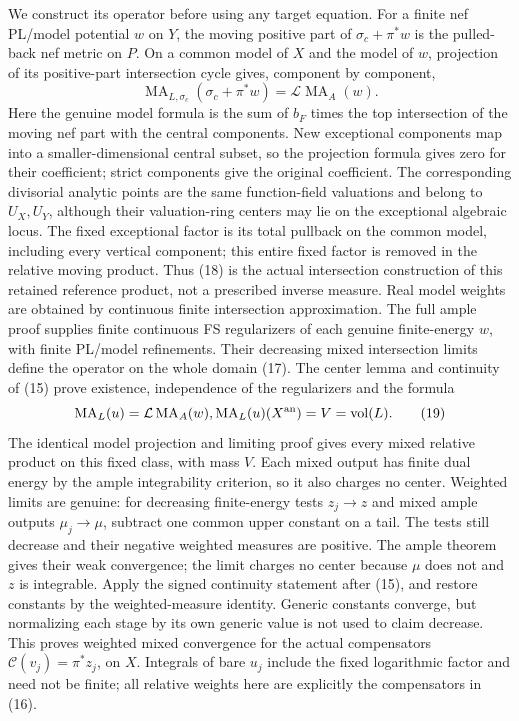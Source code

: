 \documentclass[11pt]{article}
\newcommand{\vol}{\operatorname{vol}}
\newcommand{\MA}{\operatorname{MA}}
\begin{document}
We construct its operator before using any target equation. For a
finite nef PL/model potential $w$ on $Y$, the moving positive part
of $\sigma_c+\pi^*w$ is the pulled-back nef metric on $P$.
On a common model of $X$ and the model of $w$, projection of its
positive-part intersection cycle gives, component by component,
\[
        \MA_{L,\sigma_c}(\sigma_c+\pi^*w)
                       =\mathcal L\MA_A(w).               \tag{18}
\]
Here the genuine model formula is the sum of $b_F$ times the top
intersection of the moving nef part with the central components.
New exceptional components map into a smaller-dimensional central
subset, so the projection formula gives zero for their coefficient;
strict components give the original coefficient. The corresponding
divisorial analytic points are the same function-field valuations
and belong to $U_X,U_Y$, although their valuation-ring centers may
lie on the exceptional algebraic locus. The fixed exceptional factor is its total pullback on the common
model, including every vertical component; this entire fixed factor is
removed in the relative moving product.
Thus (18) is the actual intersection construction of this retained
reference product, not a prescribed inverse measure. Real model
weights are obtained by continuous finite intersection approximation.
The full ample proof supplies finite continuous FS regularizers
of each genuine finite-energy $w$, with finite PL/model refinements.
Their decreasing mixed intersection limits define the operator on
the whole domain (17). The center lemma and continuity of (15)
prove existence, independence of the regularizers and the formula
\[
                 \MA_L(u)=\mathcal L\MA_A(w),
                   \MA_L(u)(X^{\rm an})=V=\vol(L).         \tag{19}
\]
The identical model projection and limiting proof gives every mixed
relative product on this fixed class, with mass $V$. Each mixed output
has finite dual energy by the ample integrability criterion, so it
also charges no center. Weighted limits are genuine: for decreasing
finite-energy tests $z_j\to z$ and mixed ample outputs
$\mu_j\to\mu$, subtract one common upper constant on a tail.
The tests still decrease and their negative weighted measures are
positive. The ample theorem gives their weak convergence; the limit
charges no center because $\mu$ does not and $z$ is integrable.
Apply the signed continuity statement after (15), and restore constants
by the weighted-measure identity. Generic constants converge, but
normalizing each stage by its own generic value is not used to claim
decrease. This proves
weighted mixed convergence for the actual compensators
$\mathcal C(v_j)=\pi^*z_j$, on $X$. Integrals of bare $u_j$
include the fixed logarithmic factor and need not be finite; all
relative weights here are explicitly the compensators in (16).
\end{document}
